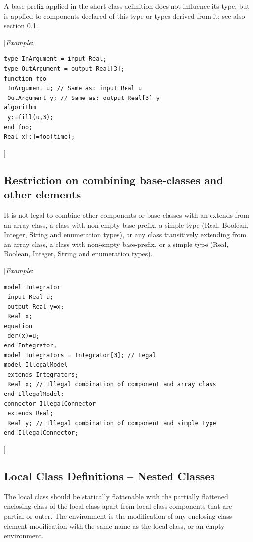 \documentclass[10pt,a4paper]{report}
\def\Mcommentbegin#1{{[}\emph{#1}}
\def\Mcommentend#1{\emph{#1}{]}}
\def\doublelabel#1{\label{#1}\hypertarget{#1}{}}
\begin{document}
A base-prefix applied in the short-class definition does not influence
its type, but is applied to components declared of this type or types
derived from it; see also section \ref{restriction-on-combining-baseclasses-and-other-elements}.

\Mcommentbegin{Example}:
\begin{lstlisting}[language=modelica]
type InArgument = input Real;
type OutArgument = output Real[3];
function foo
 InArgument u; // Same as: input Real u
 OutArgument y; // Same as: output Real[3] y
algorithm
 y:=fill(u,3);
end foo;
Real x[:]=foo(time);
\end{lstlisting}
\Mcommentend{}

\subsection{Restriction on combining base-classes and other elements}\doublelabel{restriction-on-combining-baseclasses-and-other-elements}

It is not legal to combine other components or base-classes with an
extends from an array class, a class with non-empty base-prefix, a
simple type (Real, Boolean, Integer, String and enumeration types), or
any class transitively extending from an array class, a class with
non-empty base-prefix, or a simple type (Real, Boolean, Integer, String
and enumeration types).

\Mcommentbegin{Example}:
\begin{lstlisting}[language=modelica]
model Integrator
 input Real u;
 output Real y=x;
 Real x;
equation
 der(x)=u;
end Integrator;
model Integrators = Integrator[3]; // Legal
model IllegalModel
 extends Integrators;
 Real x; // Illegal combination of component and array class
end IllegalModel;
connector IllegalConnector
 extends Real;
 Real y; // Illegal combination of component and simple type
end IllegalConnector; 
\end{lstlisting}
\Mcommentend{}

\subsection{Local Class Definitions -- Nested Classes}

The local class should be statically flattenable with the partially
flattened enclosing class of the local class apart from local class
components that are partial or outer. The environment is the
modification of any enclosing class element modification with the same
name as the local class, or an empty environment.
\end{document}
